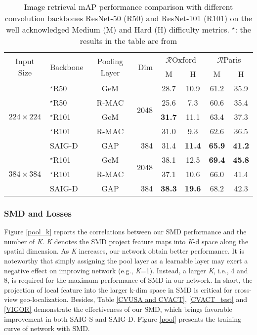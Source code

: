 \documentclass[sn-basic,iicol]{sn-jnl}
\theoremstyle{thmstyletwo}\newtheorem{example}{Example}\newtheorem{remark}{Remark}
\theoremstyle{thmstylethree}\newtheorem{definition}{Definition}
\begin{document}
 
 \begin{table*}
\setlength{\abovecaptionskip}{0.2cm}
\centering
\begin{tabular}{clc|r|cccc}
\toprule
\multirow{2}{*}{Input Size} & \multirow{2}{*}{Backbone} & \multirow{2}{*}{Pooling Layer} & \multirow{2}{*}{Dim} & \multicolumn{2}{c}{$\mathcal{R}$Oxford} & \multicolumn{2}{c}{$\mathcal{R}$Paris}\\ \cmidrule{5-8}
~&~&~ &~&M&\multicolumn{1}{c|}{H}&M&H\\ \midrule 
\multirow{5}{*}{$224\times224$}&${}^{\star}$R50&GeM&\multirow{4}{*}{2048}&28.7&\multicolumn{1}{c|}{10.9}&61.2&35.9 \\
~&${}^{\star}$R50&R-MAC&~&25.6&\multicolumn{1}{c|}{7.3}&60.6&35.4 \\
~&${}^{\star}$R101&GeM&~&\textbf{31.7}&\multicolumn{1}{c|}{11.1}&63.4&37.3 \\
~&${}^{\star}$R101&R-MAC&~&31.0&\multicolumn{1}{c|}{9.3}&62.6&36.5 \\
~&SAIG-D&GAP&384& 31.4&\multicolumn{1}{c|}{\textbf{11.4}}& \textbf{65.9}& \textbf{41.2}\\ \midrule
\multirow{3}{*}{$384\times384$}&${}^{\star}$R101&GeM&\multirow{2}{*}{2048}&38.1&\multicolumn{1}{c|}{12.5}&\textbf{69.4}&\textbf{45.8} \\
~&${}^{\star}$R101&R-MAC&~&37.1&\multicolumn{1}{c|}{10.6}& 66.0& 41.4 \\
~&SAIG-D&GAP&384& \textbf{38.3}&\multicolumn{1}{c|}{\textbf{19.6}} &68.2 &42.3  \\
\bottomrule
\end{tabular}
\caption{Image retrieval mAP performance comparison with different convolution backbones ResNet-50 (R50) and ResNet-101 (R101) on the well acknowledged Medium (M) and Hard (H) difficulty metrics. $^{\star}$: the results in the table are from \protect\citep{TrainViTforImageRetri}}
\label{Image retrieval}
\end{table*}
 
\subsubsection{SMD and Losses} Figure \ref{pool_k} reports the correlations between our SMD performance and the number of \emph{K}. \emph{K} denotes the SMD project feature maps into \emph{K}-d space along the spatial dimension. 
As \emph{K} increases, our network obtain better performance. It is noteworthy that simply assigning the pool layer as a learnable layer may exert a negative effect on improving network (e.g., \emph{K}=1). Instead, a larger \emph{K}, i.e., 4 and 8, is required for the maximum performance of SMD in our network. In short, the projection of local feature into the larger k-dim space in SMD is critical for cross-view geo-localization. Besides, Table \ref{CVUSA and CVACT}, \ref{CVACT_test} and \ref{VIGOR} demonstrate the effectiveness of our SMD, which brings favorable improvement in both SAIG-S and SAIG-D. Figure \ref{pool} presents the training curve of network with SMD.
\end{document}
